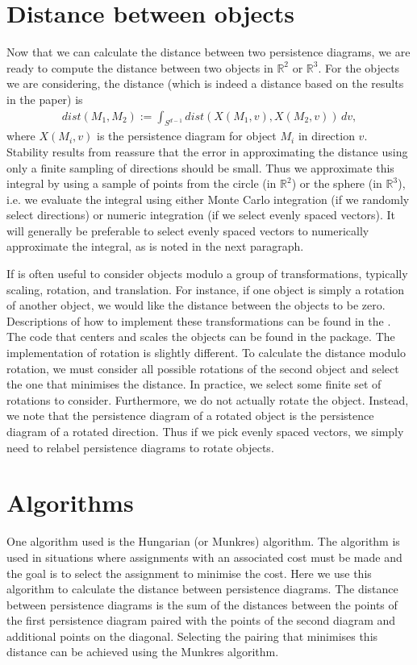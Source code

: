 \documentclass[codesnippet]{jss}
\begin{document}
\section[Distance objects]{Distance between objects}
Now that we can calculate the distance between two persistence diagrams, we are ready to compute the distance between two objects in $\mathbb{R}^2$ or $\mathbb{R}^3$.  For the objects we are considering, the distance (which is indeed a distance based on the results in the paper) is
\begin{align}
dist(M_1,M_2) := \int_{S^{d-1}} dist(X(M_1,v),X(M_2,v))\,dv,
\end{align}
where $X(M_i,v)$ is the persistence diagram for object $M_i$ in direction $v$.  Stability results from \cite{foo2010} reassure that the error in approximating the distance using only a finite sampling of directions should be small.  Thus we approximate this integral by using a sample of points from the circle (in $\mathbb{R}^2$) or the sphere (in $\mathbb{R}^3$), i.e. we evaluate the integral using either Monte Carlo integration (if we randomly select directions) or numeric integration (if we select evenly spaced vectors).  It will generally be preferable to select evenly spaced vectors to numerically approximate the integral, as is noted in the next paragraph.  

If is often useful to consider objects modulo a group of transformations, typically scaling, rotation, and translation. For instance, if one object is simply a rotation of another object, we would like the distance between the objects to be zero.  Descriptions of how to implement these transformations can be found in the \cite{foo2010}.  The code that centers and scales the objects can be found in the package.  The implementation of rotation is slightly different.  To calculate the distance modulo rotation, we must consider all possible rotations of the second object and select the one that minimises the distance.  In practice, we select some finite set of rotations to consider.  Furthermore, we do not actually rotate the object.  Instead, we note that the persistence diagram of a rotated object is the persistence diagram of a rotated direction.  Thus if we pick evenly spaced vectors, we simply need to relabel persistence diagrams to rotate objects.

\section[algorithm]{Algorithms}
One algorithm used is the Hungarian (or Munkres) algorithm.  The algorithm is used in situations where assignments with an associated cost must be made and the goal is to select the assignment to minimise the cost.  Here we use this algorithm to calculate the distance between persistence diagrams. The distance between persistence diagrams is the sum of the distances between the points of the first persistence diagram paired with the points of the second diagram and additional points on the diagonal.  Selecting the pairing that minimises this distance can be achieved using the Munkres algorithm.
\end{document}
